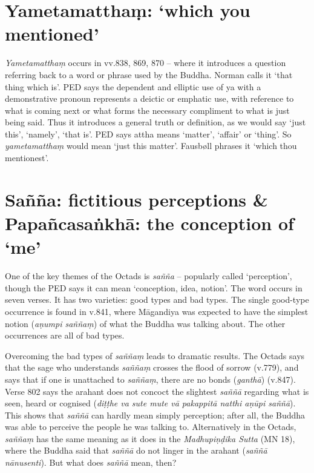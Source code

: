 \section*{Yametamattha\d{m}: `which you mentioned'}\label{transl-which-you-mentioned}

\textit{Yametamatthaṃ} occurs in vv.838, 869, 870 -- where it introduces a question referring back to a word or phrase used by the Buddha. Norman calls it `that thing which is'. PED says the dependent and elliptic use of ya with a demonstrative pronoun represents a deictic or emphatic use, with reference to what is coming next or what forms the necessary compliment to what is just being said. Thus it introduces a general truth or definition, as we would say `just this', `namely', `that is'. PED says attha means `matter', `affair' or `thing'. So \textit{yametamatthaṃ} would mean `just this matter'. Fausbøll phrases it `which thou mentionest'.

\section*{Sa\~n\~na: fictitious perceptions \& Papa\~ncasa\.nkh\=a: the conception of `me'}\label{transl-fictitious-perceptions}\label{transl-conception-of-me}

One of the key themes of the Octads is \textit{sañña} -- popularly called `perception', though the PED says it can mean `conception, idea, notion'. The word occurs in seven verses. It has two varieties: good types and bad types. The single good-type occurrence is found in v.841, where Māgandiya was expected to have the simplest notion (\textit{aṇumpi saññaṃ}) of what the Buddha was talking about. The other occurrences are all of bad types.

Overcoming the bad types of \textit{saññaṃ} leads to dramatic results. The Octads says that the sage who understands \textit{saññaṃ} crosses the flood of sorrow (v.779), and says that if one is unattached to \textit{saññaṃ}, there are no bonds (\textit{ganthā}) (v.847). Verse 802 says the arahant does not concoct the slightest \textit{saññā} regarding what is seen, heard or cognised (\textit{diṭṭhe va sute mute vā pakappitā natthi aṇūpi saññā}). This shows that \textit{saññā} can hardly mean simply perception; after all, the Buddha was able to perceive the people he was talking to. Alternatively in the Octads, \textit{saññaṃ} has the same meaning as it does in the \textit{Madhupiṇḍika Sutta} (MN 18), where the Buddha said that \textit{saññā} do not linger in the arahant (\textit{saññā nānusenti}). But what does \textit{saññā} mean, then?

